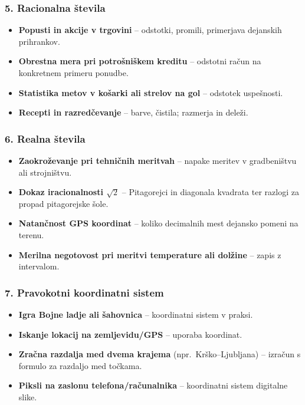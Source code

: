 \documentclass[11pt,a4paper]{article}
\begin{document}
\subsubsection*{5. Racionalna števila}
\begin{itemize}
  \item \textbf{Popusti in akcije v trgovini} -- odstotki, promili, primerjava dejanskih prihrankov.
  \item \textbf{Obrestna mera pri potrošniškem kreditu} -- odstotni račun na konkretnem primeru ponudbe.
  \item \textbf{Statistika metov v košarki ali strelov na gol} -- odstotek uspešnosti.
  \item \textbf{Recepti in razredčevanje} -- barve, čistila; razmerja in deleži.
\end{itemize}

\subsubsection*{6. Realna števila}
\begin{itemize}
  \item \textbf{Zaokroževanje pri tehničnih meritvah} -- napake meritev v gradbeništvu ali strojništvu.
  \item \textbf{Dokaz iracionalnosti $\sqrt{2}$} -- Pitagorejci in diagonala kvadrata ter razlogi za propad pitagorejske šole.
  \item \textbf{Natančnost GPS koordinat} -- koliko decimalnih mest dejansko pomeni na terenu.
  \item \textbf{Merilna negotovost pri meritvi temperature ali dolžine} -- zapis z intervalom.
\end{itemize}

\subsubsection*{7. Pravokotni koordinatni sistem}
\begin{itemize}
  \item \textbf{Igra Bojne ladje ali šahovnica} -- koordinatni sistem v praksi.
  \item \textbf{Iskanje lokacij na zemljevidu/GPS} -- uporaba koordinat.
  \item \textbf{Zračna razdalja med dvema krajema} (npr.\ Krško--Ljubljana) -- izračun s formulo za razdaljo med točkama.
  \item \textbf{Piksli na zaslonu telefona/računalnika} -- koordinatni sistem digitalne slike.
\end{itemize}
\end{document}
